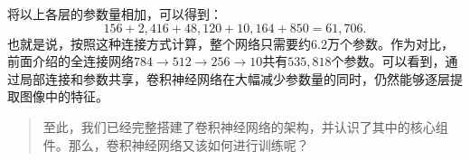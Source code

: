 将以上各层的参数量相加，可以得到：
$$
156+2,416+48,120+10,164+850=61,706.
$$
也就是说，按照这种连接方式计算，整个网络只需要约$6.2$万个参数。作为对比，前面介绍的全连接网络$784\rightarrow512\rightarrow256\rightarrow10$共有$535,818$个参数。可以看到，通过局部连接和参数共享，卷积神经网络在大幅减少参数量的同时，仍然能够逐层提取图像中的特征。

\begin{quote}
    至此，我们已经完整搭建了卷积神经网络的架构，并认识了其中的核心组件。那么，卷积神经网络又该如何进行训练呢？
\end{quote}